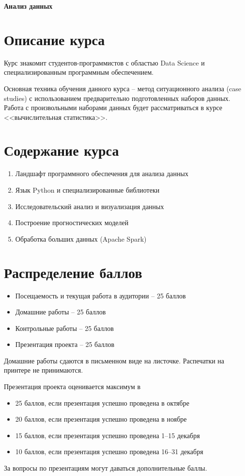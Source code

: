 \documentclass{article}
\begin{document}
{\LARGE \bf Анализ данных}

\section{Описание курса}
Курс знакомит студентов-программистов с областью Data Science
и специализированным программным обеспечением.

Основная техника обучения данного курса -- метод ситуационного анализа (case studies) с
использованием предварительно подготовленных наборов данных.
Работа с произвольными наборами данных будет рассматриваться в курсе <<вычислительная статистика>>.

\section{Содержание курса}
\begin{enumerate}
\item Ландшафт программного обеспечения для анализа данных
\item Язык Python и специализированные библиотеки
\item Исследовательский анализ и визуализация данных
\item Построение прогностических моделей
\item Обработка больших данных (Apache Spark)
\end{enumerate}


\section{Распределение баллов}

\begin{itemize}
\item Посещаемость и текущая работа в аудитории -- 25 баллов
\item Домашние работы -- 25 баллов
\item Контрольные работы -- 25 баллов
\item Презентация проекта -- 25 баллов
\end{itemize}

Домашние работы сдаются в письменном виде на листочке. Распечатки на принтере не принимаются.

Презентация проекта оценивается максимум в
\begin{itemize}
\item 25 баллов, если презентация успешно проведена в октябре
\item 20 баллов, если презентация успешно проведена в ноябре
\item 15 баллов, если презентация успешно проведена 1--15 декабря
\item 10 баллов, если презентация успешно проведена 16--31 декабря
\end{itemize}
За вопросы по презентациям могут даваться дополнительные баллы.
\end{document}
